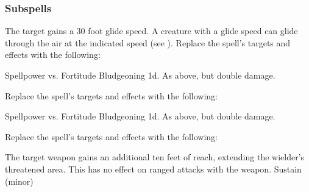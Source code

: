 \subsubsection{Subspells}
The target gains a 30 foot glide speed.
A creature with a glide speed can glide through the air at the indicated speed (see ).
Replace the spell's targets and effects with the following:
\begin{spellcontent}
\begin{augmenttargetinginfo}
\end{augmenttargetinginfo}
\begin{augmenteffects}
\begin{spellattack}{Spellpower vs. Fortitude}
\spellsuccess Bludgeoning  \plus1d.
\spellcritical As above, but double damage.
\end{spellattack}
\end{augmenteffects}
\end{spellcontent}
Replace the spell's targets and effects with the following:
\begin{spellcontent}
\begin{augmenttargetinginfo}
\end{augmenttargetinginfo}
\begin{augmenteffects}
\begin{spellattack}{Spellpower vs. Fortitude}
\spellsuccess Bludgeoning  \minus1d.
\spellcritical As above, but double damage.
\end{spellattack}
\end{augmenteffects}
\end{spellcontent}
Replace the spell's targets and effects with the following:
\begin{spellcontent}
\begin{augmenttargetinginfo}
\end{augmenttargetinginfo}
\begin{augmenteffects}
\spelleffect
The target weapon gains an additional ten feet of reach, extending the wielder's threatened area.
This has no effect on ranged attacks with the weapon.
\spelldur Sustain (minor)
\end{augmenteffects}
\end{spellcontent}
